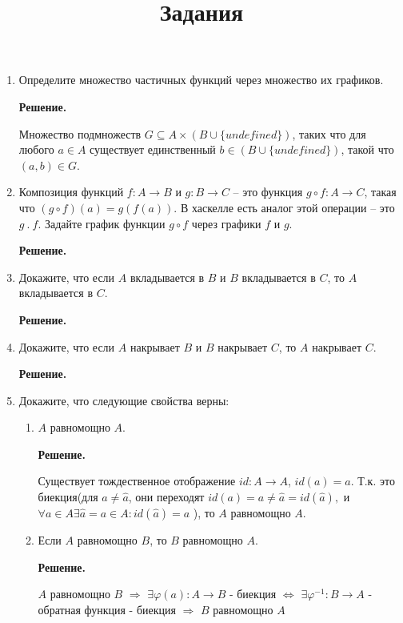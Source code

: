 \documentclass[draft]{article}
\begin{document}
\title{Задания}
\maketitle

\begin{enumerate}

\item Определите множество частичных функций через множество их графиков.

\textbf{Решение.} 

Множество подмножеств $G \subseteq A \times (B \cup \{undefined\})$,
таких что для любого $a \in A$ существует единственный
$b \in (B \cup \{undefined\})$, такой что $(a, b) \in G$.

\item Композиция функций $f : A \to B$ и $g : B \to C$ -- это функция $g \circ f : A \to C$, 
такая что $(g \circ f)(a) = g(f(a))$.
    В хаскелле есть аналог этой операции -- это $g\ .\ f$.
    Задайте график функции $g \circ f$ через графики $f$ и $g$.

\textbf{Решение.} 


\item Докажите, что если $A$ вкладывается в $B$ и $B$ вкладывается в $C$, то $A$ вкладывается в $C$.

\textbf{Решение.} 


\item Докажите, что если $A$ накрывает $B$ и $B$ накрывает $C$, то $A$ накрывает $C$.

\textbf{Решение.} 

\item Докажите, что следующие свойства верны:
\begin{enumerate}
\item $A$ равномощно $A$.

\textbf{Решение.} 

Существует тождественное отображение $id: A\rightarrow A$, $id(a) = a$. Т.к. это биекция(для 
$a\neq \hat{a}$, они переходят $id(a) = a \neq \hat{a} = id(\hat{a}),$ и $\forall a\in A 
\exists\hat{a} = a \in A : id(\hat{a}) = a$ ), то $A$ равномощно $A$. 

\item Если $A$ равномощно $B$, то $B$ равномощно $A$.

\textbf{Решение.} 

$A$ равномощно $B$ $\Rightarrow$ $\exists \varphi(a):A\rightarrow B$ - биекция 
$\Leftrightarrow$ $\exists \varphi^{-1} : B \rightarrow A$ - обратная функция - биекция 
$\Rightarrow$ $B$ равномощно $A$ 



\end{enumerate}
\end{enumerate}
\end{document}
